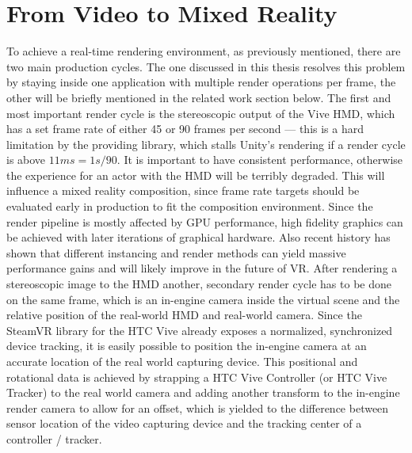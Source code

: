 %
\chapter{From Video to Mixed Reality}
\label{chap:video2mr}

To achieve a real-time rendering environment, as previously mentioned, there 
are two main production cycles. The one discussed in this thesis resolves this 
problem by staying inside one application with multiple render operations per 
frame, the other will be briefly mentioned in the related work section below. 
\newline
The first and most important render cycle is the stereoscopic output of the 
Vive HMD, which has a set frame rate of either 45 or 90 frames per second --- 
this is a hard limitation by the providing library, which stalls Unity's 
rendering if a render cycle is above $11ms = 1s / 90$. It is important to have 
consistent performance, otherwise the experience for an actor with the HMD will 
be terribly degraded. This will influence a mixed reality composition, since 
frame rate targets should be evaluated early in production to fit the 
composition environment. Since the render pipeline is mostly affected by GPU 
performance, high fidelity graphics can be achieved with later iterations of 
graphical hardware. Also recent history has shown that different instancing and 
render methods can yield massive performance gains and will likely improve in 
the future of VR\cite{oculus:improv-render:2016}.
\newline
After rendering a stereoscopic image to the HMD another, secondary render cycle 
has to be done on the same frame, which is an in-engine camera inside the 
virtual scene and the relative position of the real-world HMD and real-world 
camera. Since the SteamVR library for the HTC Vive already exposes a 
normalized, synchronized device tracking, it is easily possible to position the 
in-engine camera at an accurate location of the real world capturing device. 
This positional and rotational data is achieved by strapping a HTC Vive 
Controller (or HTC Vive Tracker) to the real world camera and adding another 
transform to the in-engine render camera to allow for an offset, which is 
yielded to the difference between sensor location of the video capturing device 
and the tracking center of a controller / tracker.

